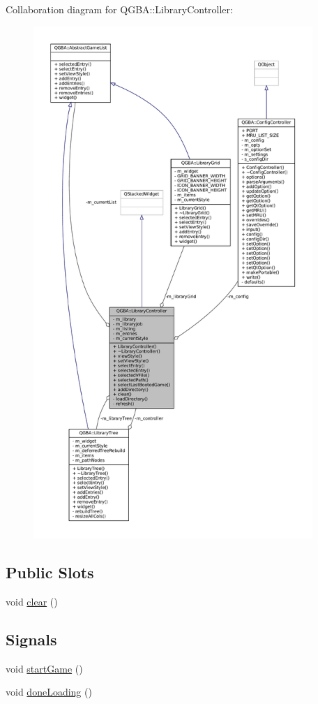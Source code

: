 Collaboration diagram for Q\+G\+BA\+:\+:Library\+Controller\+:
\nopagebreak
\begin{figure}[H]
\begin{center}
\leavevmode
\includegraphics[height=550pt]{class_q_g_b_a_1_1_library_controller__coll__graph}
\end{center}
\end{figure}
\subsection*{Public Slots}
\begin{DoxyCompactItemize}
\item 
void \mbox{\hyperlink{class_q_g_b_a_1_1_library_controller_a71ee6910dd69a573702798a708f7d378}{clear}} ()
\end{DoxyCompactItemize}
\subsection*{Signals}
\begin{DoxyCompactItemize}
\item 
void \mbox{\hyperlink{class_q_g_b_a_1_1_library_controller_a6c95f8fb4c265787962284aa7835c899}{start\+Game}} ()
\item 
void \mbox{\hyperlink{class_q_g_b_a_1_1_library_controller_a5e615220cf4daf6560b4b15eb61d0298}{done\+Loading}} ()
\end{DoxyCompactItemize}
